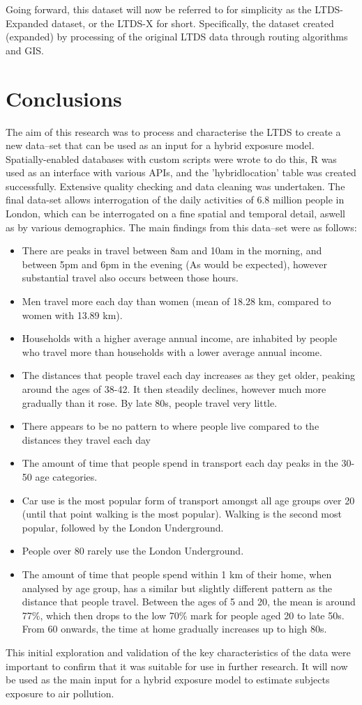 Going forward, this dataset will now be referred to for simplicity as the LTDS-Expanded dataset, or the LTDS-X for short.  Specifically, the dataset created (expanded) by processing of the original LTDS data through routing algorithms and GIS.

\section{Conclusions}
\label{sec:1conclusions}

The aim of this research was to process and characterise the LTDS to create a new data--set that can be used as an input for a hybrid exposure model. Spatially-enabled databases with custom scripts were wrote to do this, R was used as an interface with various APIs, and the 'hybrid\textunderscore location' table was created successfully. Extensive quality checking and data cleaning was undertaken. The final data-set allows interrogation of the daily activities of 6.8 million people in London, which can be interrogated on a fine spatial and temporal detail, aswell as by various demographics. The main findings from this data--set were as follows:

\begin{itemize}
\item There are peaks in travel between 8am and 10am in the morning, and between 5pm and 6pm in the evening (As would be expected), however substantial travel also occurs between those hours.
\item Men travel more each day than women (mean of 18.28 km, compared to women with 13.89 km).
\item Households with a higher average annual income, are inhabited by people who travel more than households with a lower average annual income.
\item The distances that people travel each day increases as they get older, peaking around the ages of 38-42. It then steadily declines, however much more gradually than it rose. By late 80s, people travel very little.
\item There appears to be no pattern to where people live compared to the distances they travel each day
\item The amount of time that people spend in transport each day peaks in the 30-50 age categories.
\item Car use is the most popular form of transport amongst all age groups over 20 (until that point walking is the most popular). Walking is the second most popular, followed by the London Underground.
\item People over 80 rarely use the London Underground.
\item The amount of time that people spend within 1 km of their home, when analysed by age group, has a similar but slightly different pattern as the distance that people travel. Between the ages of 5 and 20, the mean is around 77\%, which then drops to the low 70\% mark for people aged 20 to late 50s. From 60 onwards, the time at home gradually increases up to high 80s.
\end{itemize}

This initial exploration and validation of the key characteristics of the data were important to confirm that it was suitable for use in further research. It will now be used as the main input for a hybrid exposure model to estimate subjects exposure to air pollution. 